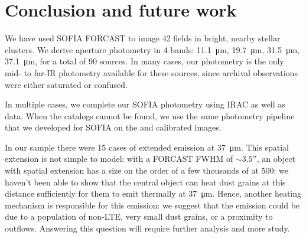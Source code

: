 %
%
%



\section{Conclusion and future work}

We have used SOFIA FORCAST to image 42 fields in bright, nearby stellar clusters. We derive aperture photometry in 4 bands: \SI{11.1}{\um}, \SI{19.7}{\um}, \SI{31.5}{\um}, \SI{37.1}{\um}, for a total of 90 sources. In many cases, our photometry is the only mid- to far-IR photometry available for these sources, since archival \Spitzer observations were either saturated or confused.

In multiple cases, we complete our SOFIA photometry using \Spitzer IRAC as well as \Herschel data. When the catalogs cannot be found, we use the same photometry pipeline that we developed for SOFIA on the \Spitzer and \Herschel calibrated images.

In our sample there were 15 cases of extended emission at \SI{37}{\um}. This spatial extension is not simple to model: with a FORCAST FWHM of $\sim\ang{;;3.5}$, an object with spatial extension has a size on the order of a few thousands of \si{\au} at \SI{500}{\pc}: we haven't been able to show that the central object can heat dust grains at this distance sufficiently for them to emit thermally at \SI{37}{\um}. Hence, another heating mechanism is responsible for this emission: we suggest that the emission could be due to a population of non-LTE, very small dust grains, or a proximity to outflows. Answering this question will require further analysis and more study.

